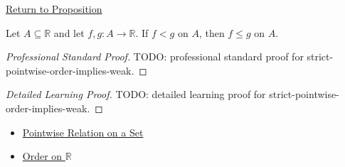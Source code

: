 \newpage
{}
\label{prf:strict-pointwise-order-implies-weak}

\begin{remark*}[Return]
\hyperref[prop:strict-pointwise-order-implies-weak]{Return to Proposition}
\end{remark*}

\begin{proposition*}
Let \(A\subseteq\mathbb{R}\) and let \(f,g:A\to\mathbb{R}\).  If
\(f<g\) on \(A\), then \(f\leq g\) on \(A\).
\end{proposition*}

\begin{proof}[Professional Standard Proof]
\LRAProofBodyStart
TODO: professional standard proof for strict-pointwise-order-implies-weak.
\end{proof}

\begin{proof}[Detailed Learning Proof]
\LRAProofBodyStart
TODO: detailed learning proof for strict-pointwise-order-implies-weak.
\end{proof}

\begin{remark*}
\end{remark*}

\begin{dependencies}
\begin{itemize}
  \item \hyperref[def:pointwise-relation-on-set]{Pointwise Relation on a Set}
  \item \hyperref[def:order-on-r]{Order on \(\mathbb{R}\)}
\end{itemize}
\end{dependencies}

\clearpage
